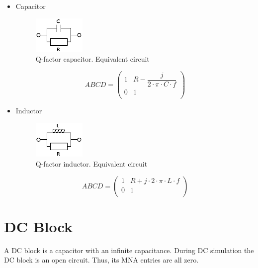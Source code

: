 \begin{itemize}
\item Capacitor
\begin{figure}[ht]
\begin{center}
\includegraphics[width=2.5cm]{capq}
\end{center}
\caption{Q-factor capacitor. Equivalent circuit}
\label{fig:capq_ec}
\end{figure}

\begin{equation}
ABCD =
\begin{pmatrix}
1 & R - \dfrac{j} {2 \cdot \pi\cdot C \cdot f}\\
0 & 1\\
\end{pmatrix}
\end{equation}

\item Inductor
\begin{figure}[ht]
\begin{center}
\includegraphics[width=2.5cm]{indq}
\end{center}
\caption{Q-factor inductor. Equivalent circuit}
\label{fig:capq_ec}
\end{figure}

\begin{equation}
ABCD =
\begin{pmatrix}
1 & R + j \cdot 2 \cdot \pi\cdot L \cdot f\\
0 & 1\\
\end{pmatrix}
\end{equation}

\end{itemize}

\section{DC Block}

A DC block is a capacitor with an infinite capacitance. During DC
simulation the DC block is an open circuit. Thus, its MNA
entries are all zero.

